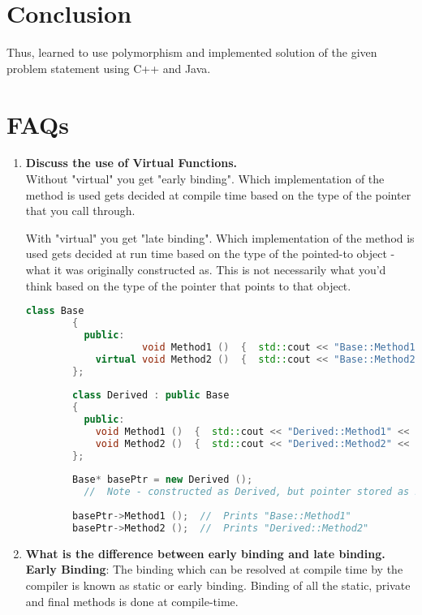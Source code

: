 \documentclass[11pt]{article}
\begin{document}
\pagebreak

\section{Conclusion}
Thus, learned to use polymorphism and implemented solution of the given problem statement using C++ and Java.

\section{FAQs}

\begin{enumerate}
	\item \textbf{Discuss the use of Virtual Functions. }\\
	      Without "virtual" you get "early binding". Which implementation of the method is used gets decided at compile time based on the type of the pointer that you call through.

	      With "virtual" you get "late binding". Which implementation of the method is used gets decided at run time based on the type of the pointed-to object - what it was originally constructed as. This is not necessarily what you'd think based on the type of the pointer that points to that object.

	      \begin{lstlisting}[language=C++]
		class Base
		{
		  public:
					void Method1 ()  {  std::cout << "Base::Method1" << std::endl;  }
			virtual void Method2 ()  {  std::cout << "Base::Method2" << std::endl;  }
		};
		
		class Derived : public Base
		{
		  public:
			void Method1 ()  {  std::cout << "Derived::Method1" << std::endl;  }
			void Method2 ()  {  std::cout << "Derived::Method2" << std::endl;  }
		};
		
		Base* basePtr = new Derived ();
		  //  Note - constructed as Derived, but pointer stored as Base*
		
		basePtr->Method1 ();  //  Prints "Base::Method1"
		basePtr->Method2 ();  //  Prints "Derived::Method2"		
	\end{lstlisting}
	\item \textbf{What is the difference between early binding and late binding. }\\
	      \textbf{Early Binding}: The binding which can be resolved at compile time by the compiler is known as static or early binding. Binding of all the static, private and final methods is done at compile-time.


\end{enumerate}
\end{document}
